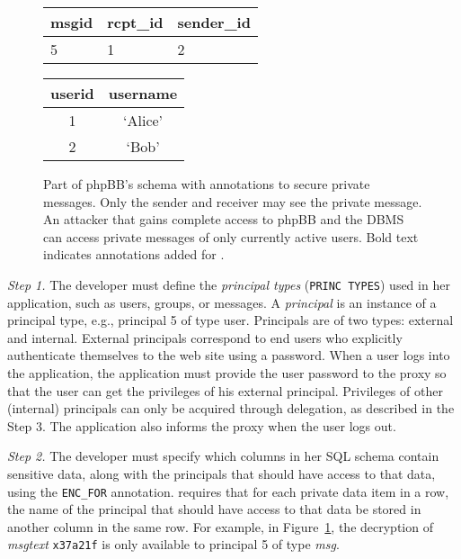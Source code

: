 \begin{figure}[t!]
\begin{framed}
\begin{minipage}[h]{1.7 in}
  \smallskip

  \begin{tabular}{p{0.8cm}|p{1cm}|p{0.8cm}}
  msgid & rcpt\_id  & sender\_id \\ \hline
  5 & 1 & 2 \\ 
  \end{tabular}
\end{minipage}
\hspace{0mm}
\begin{minipage}[h]{0.9in}
 \centering
  \begin{tabular}{c|c}
  userid & username \\ \hline
  1 & `Alice'  \\  
  2 & `Bob' 
  \end{tabular}
 \end{minipage}
\end{framed}

\caption{
Part of phpBB's schema with annotations to secure private messages.
Only the sender and receiver may see the private message. An attacker
that gains complete access to phpBB and the DBMS can access
private messages of only currently active users.  Bold text indicates
annotations added for \name.
    }
\label{fig:privmsg}
\end{figure}

{\em Step 1.} The developer must define the {\em principal types}
({\small \tt PRINC TYPES}) used in her application, such as users,
groups, or messages.  A {\em principal} is an instance of a principal
type, e.g., principal 5 of type user.  Principals are of two types:
external and internal. External principals correspond to end users who
explicitly authenticate themselves to the web site using a password.
When a user logs into the application, the application must provide
the user password to the \name proxy so that the user can get the
privileges of his external principal.  Privileges of other (internal)
principals can only be acquired through delegation, as described in
the Step 3.  The application also informs the proxy when the user logs
out.

{\em Step 2.} The developer must specify which columns in her SQL
schema contain sensitive data, along with the principals that should
have access to that data, using the {\tt \small ENC\_FOR}
annotation.  \name requires that for each private data item in a row,
the name of the principal that should have access to that data be
stored in another column in the same row.
For example, in Figure~\ref{fig:privmsg}, the decryption of {\em msgtext}
\texttt{x37a21f} is only available to principal 5 of type {\em msg}.

